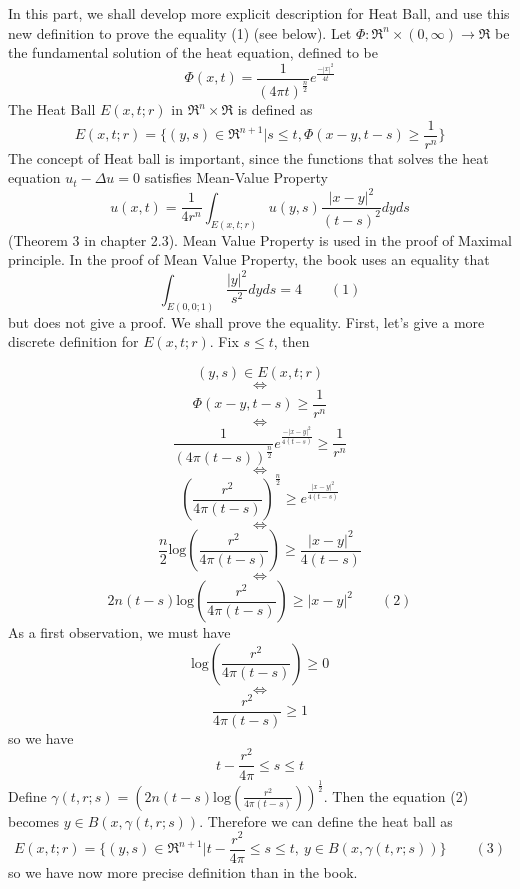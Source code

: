 \documentclass[a4paper,10pt]{article}
\begin{document}
In this part, we shall develop more explicit description for Heat Ball, and use this new definition to prove the equality (1) (see below). Let $\Phi:\Re^n\times (0,\infty)\rightarrow \Re$ be the fundamental solution of the heat equation, defined to be	$$\Phi(x,t)=\frac{1}{(4\pi t)^{\frac{n}{2}}}e^{\frac{-|x|^2}{4t}} $$
The Heat Ball $E(x,t;r)$ in $\Re^n\times\Re$ is defined as
$$ E(x,t;r)=\{(y,s)\in\Re^{n+1}|s\leq t, \Phi(x-y,t-s)\geq \frac{1}{r^n}\}$$
The concept of Heat ball is important, since the functions that solves the heat equation $u_t-\Delta u=0$ satisfies Mean-Value Property 
$$u(x,t)=\frac{1}{4r^n}\int_{E(x,t;r)}u(y,s)\frac{|x-y|^2}{(t-s)^2}dyds $$
(Theorem 3 in chapter 2.3). Mean Value Property is used in the proof of Maximal principle. In the proof of Mean Value Property, the book uses an equality that $$\int_{E(0,0;1)}\frac{|y|^2}{s^2}dyds=4 \qquad(1)$$
but does not give a proof. We shall prove the equality. First, let's give a more discrete definition for $E(x,t;r)$. Fix $s\leq t$, then
	
$$ (y,s)\in E(x,t;r)$$ $$\iff$$
$$\Phi(x-y,t-s)\geq \frac{1}{r^n} $$ $$\iff $$ $$\frac{1}{(4\pi(t-s))^{\frac{n}{2}}}e^{\frac{-|x-y|^2}{4(t-s)}}\geq \frac{1}{r^n} $$ $$\iff $$
$$	(\frac{r^2}{4\pi(t-s)})^{\frac{n}{2}}\geq e^{\frac{|x-y|^2}{4(t-s)}}  $$ $$\iff $$
$$\frac{n}{2}\text{log}(\frac{r^2}{4\pi(t-s)})\geq \frac{|x-y|^2}{4(t-s)} $$ $$ \iff $$
$$ 2n(t-s)\text{log}(\frac{r^2}{4\pi(t-s)})\geq |x-y|^2 \qquad (2)$$ As a first observation, we must have $$\text{log}(\frac{r^2}{4\pi(t-s)})\ge0$$ $$\iff$$ $$\frac{r^2}{4\pi(t-s)}\ge 1$$ so we have $$t-\frac{r^2}{4\pi}\le s\le t$$ Define $\gamma(t,r;s)=(2n(t-s)\text{log}(\frac{r^2}{4\pi(t-s)}))^{\frac{1}{2}}$. Then the equation (2) becomes $y\in B(x,\gamma(t,r;s))$. Therefore we can define the heat ball as $$E(x,t;r)=\{(y,s)\in\Re^{n+1}\big|t-\frac{r^2}{4\pi}\le s\le t, \> y\in B(x,\gamma(t,r;s))\} \qquad (3)$$ so we have now more precise definition than in the book.\\
\end{document}
